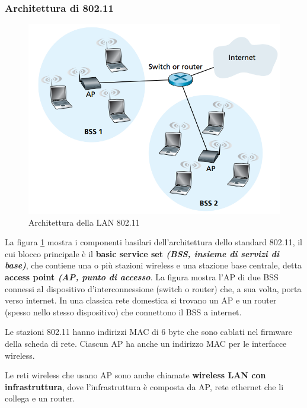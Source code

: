 \documentclass[11pt,a4paper]{article}
\begin{document}
\subsubsection{Architettura di 802.11}
\begin{figure}
	\includegraphics[scale=0.5]{img/095.png}
	\caption{Architettura della LAN 802.11}
	\label{fig: 095}
\end{figure}
La figura \ref{fig: 095} mostra i componenti basilari dell'architettura dello standard 802.11, il cui blocco principale è il \textbf{basic service set \textit{(BSS, insieme di servizi di base)}}, che contiene una o più stazioni wireless e una stazione base centrale, detta \textbf{access point \textit{(AP, punto di accesso}}. La figura mostra l'AP di due BSS connessi al dispositivo d'interconnessione (switch o router) che, a sua volta, porta verso internet. In una classica rete domestica si trovano un AP e un router (spesso nello stesso dispositivo) che connettono il BSS a internet.

Le stazioni 802.11 hanno indirizzi MAC di 6 byte che sono cablati nel firmware della scheda di rete. Ciascun AP ha anche un indirizzo MAC per le interfacce wireless.

Le reti wireless che usano AP sono anche chiamate \textbf{wireless LAN con infrastruttura}, dove l'infrastruttura è composta da AP, rete ethernet che li collega e un router.
\end{document}
